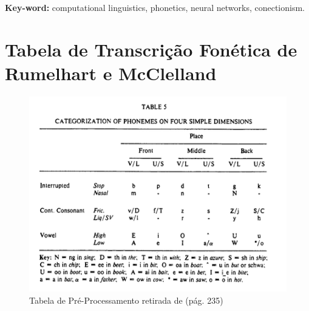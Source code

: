 \documentclass[12pt,twoside,a4paper]{book}
\begin{document}
 \textbf{Key-word:}
computational linguistics, phonetics, neural networks, conectionism.





\tableofcontents
\onehalfspacing            %
\mainmatter

\fancyhead[RE,LO]{\thesection}






\clearpage
\appendix

\chapter{Tabela de Transcrição Fonética de Rumelhart e McClelland}
\label{apendice:rumelhart}
\begin{figure}
    \centering
    \includegraphics[scale=0.8]{img/rumelhartpreprocess.png}
    \caption{Tabela de Pré-Processamento retirada de \cite{rumelhart:1986} (pág. 235)}
    \label{fig:preprocess-rumelhart}
\end{figure}
\end{document}
